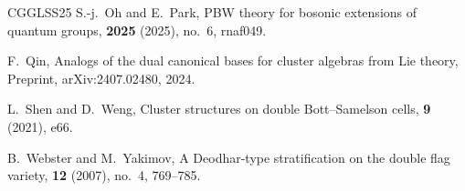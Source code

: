 \documentclass[12pt, reqno]{amsart}
\theoremstyle{plain}
\theoremstyle{definition}
\numberwithin{equation}{section}
\begin{document}
\begin{thebibliography}{CGGLSS25}
S.-j.~Oh and E.~Park,
\newblock PBW theory for bosonic extensions of quantum groups,
 \textbf{2025} (2025), no.~6, rnaf049.

F.~Qin,
\newblock Analogs of the dual canonical bases for cluster algebras from Lie theory,
\newblock Preprint, arXiv:2407.02480, 2024.

L.~Shen and D.~Weng,
\newblock Cluster structures on double Bott--Samelson cells,
 \textbf{9} (2021), e66.

B.~Webster and M.~Yakimov,
\newblock A Deodhar-type stratification on the double flag variety,
 \textbf{12} (2007), no.~4, 769--785.

\end{thebibliography}
\end{document}
